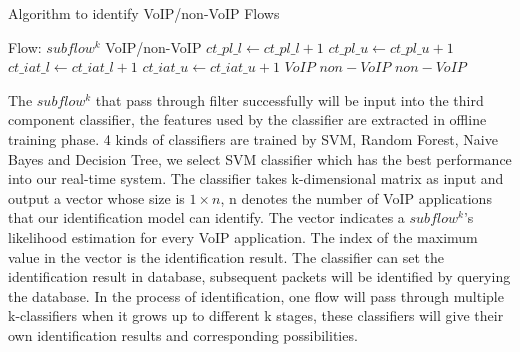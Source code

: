 \documentclass[conference]{IEEEtran}
\begin{document}
\renewcommand{\algorithmicrequire}{\textbf{Input:}}
\renewcommand{\algorithmicensure}{\textbf{Output:}}

\begin{algorithm}[!h]
\caption{Algorithm to identify VoIP/non-VoIP Flows}
\label{algorithm:filter}
\begin{algorithmic}[1]
\REQUIRE Flow: $subflow^k$
\ENSURE VoIP/non-VoIP
       	\STATE $ct\_pl\_l \gets ct\_pl\_l +1$
       \ENDIF
       	\STATE $ct\_pl\_u \gets ct\_pl\_u+1$
       \ENDIF
       	\STATE $ct\_iat\_l  \gets ct\_iat\_l+1$
       \ENDIF
       	\STATE $ct\_iat\_u \gets ct\_iat\_u+1$
       \ENDIF
    \ENDFOR
        \RETURN $VoIP$
    \ELSE  \RETURN $non-VoIP$
   \ENDIF
\ELSE \RETURN $non-VoIP$
\ENDIF
\end{algorithmic}
\end{algorithm}

The $subflow^k$ that pass through filter successfully will be input into the third component classifier, the features used by the classifier are extracted in offline training phase. 4 kinds of classifiers are trained by SVM, Random Forest, Naive Bayes and Decision Tree, we select SVM classifier which has the best performance into our real-time system. The classifier takes k-dimensional matrix as input and output a vector whose size is $1 \times n$,  n denotes the number of VoIP applications that our identification model can identify. The vector indicates a $subflow^k$'s likelihood estimation for every VoIP application. The index of the maximum value in the vector is the identification result. The classifier can set the identification result in database, subsequent packets will be identified by querying the database. In the process of identification, one flow will pass through multiple k-classifiers when it grows up to different k stages, these classifiers will give their own identification results and corresponding possibilities.
\end{document}
